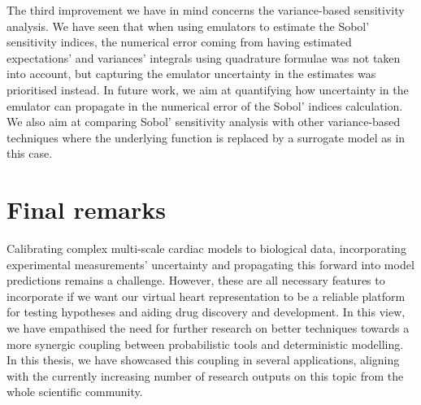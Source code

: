 \vspace{0.2cm}
The third improvement we have in mind concerns the variance-based sensitivity analysis. We have seen that when using emulators to estimate the Sobol' sensitivity indices, the numerical error coming from having estimated expectations' and variances' integrals using quadrature formulae was not taken into account, but capturing the emulator uncertainty in the estimates was prioritised instead. In future work, we aim at quantifying how uncertainty in the emulator can propagate in the numerical error of the Sobol' indices calculation. We also aim at comparing Sobol' sensitivity analysis with other variance-based techniques where the underlying function is replaced by a surrogate model as in this case.


%
%
%
\section{Final remarks}\label{sec:ch9conclusions}
Calibrating complex multi-scale cardiac models to biological data, incorporating experimental measurements' uncertainty and propagating this forward into model predictions remains a challenge. However, these are all necessary features to incorporate if we want our virtual heart representation to be a reliable platform for testing hypotheses and aiding drug discovery and development. In this view, we have empathised the need for further research on better techniques towards a more synergic coupling between probabilistic tools and deterministic modelling. In this thesis, we have showcased this coupling in several applications, aligning with the currently increasing number of research outputs on this topic from the whole scientific community.